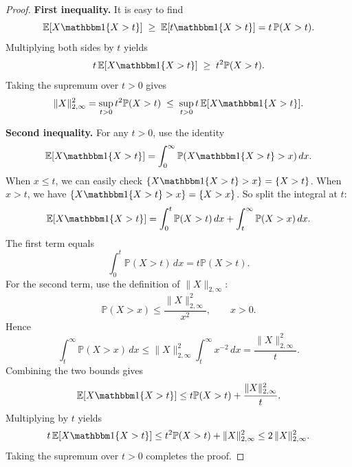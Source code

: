 \documentclass[12pt]{article}
\renewcommand{\(}{\left(}%
\renewcommand{\)}{\right)}%
\renewcommand{\[}{\left[}%
\renewcommand{\]}{\right]}%
\newcommand{\p}{\mathbb{P}}
\newtheorem{proof}{Proof.}}
\begin{document}
\begin{proof}

\textbf{First inequality.}
It is easy to find
\begin{equation*}
\mathbb E [X \mathbbm 1\{X>t\} ]
\;\ge\; \mathbb E [t \mathbbm 1\{X>t\}]=
t\,\p(X>t).
\end{equation*}
Multiplying both sides by $t$ yields
\begin{equation*}
t\,\mathbb E [X \mathbbm 1\{X>t\} ]
\;\ge\;
t^2 \p(X>t).
\end{equation*}
Taking the supremum over $t>0$ gives
\begin{equation*}
\|X\|_{2,\infty}^2
=
\sup_{t>0} t^2 \p(X>t)
\;\le\;
\sup_{t>0} t\,\mathbb E [X \mathbbm 1\{X>t\} ].
\end{equation*}

\medskip
\noindent
\textbf{Second inequality.}
For any $t>0$, use the identity
\begin{equation*}
\mathbb E [X \mathbbm 1\{X>t\} ]
=
\int_0^\infty \p (X \mathbbm 1\{X>t\}>x )\,dx.
\end{equation*}
When $x\leq t$, we can easily check $\{X \mathbbm 1\{X>t\}>x\}=\{X>t\}$. When $x>t$, we have $\{X \mathbbm 1\{X>t\}>x\}=\{X>x\}$. So
split the integral at $t$:
\begin{equation*}
\mathbb E [X \mathbbm 1\{X>t\} ]
=
\int_0^t \p(X>t)\,dx
+
\int_t^\infty \p(X>x)\,dx.
\end{equation*}
The first term equals
\begin{equation*}
\int_0^t \p(X>t)\,dx
=
t \p(X>t).
\end{equation*}
For the second term, use the definition of $\|X\|_{2,\infty}$:
\begin{equation*}
\p(X>x)
\le
\frac{\|X\|_{2,\infty}^2}{x^2},
\qquad x>0.
\end{equation*}
Hence
\begin{equation*}
\int_t^\infty \p(X>x)\,dx
\le
\|X\|_{2,\infty}^2
\int_t^\infty x^{-2}\,dx
=
\frac{\|X\|_{2,\infty}^2}{t}.
\end{equation*}
Combining the two bounds gives
\begin{equation*}
\mathbb E [X \mathbbm 1\{X>t\} ]
\le
t \p(X>t)
+
\frac{\|X\|_{2,\infty}^2}{t}.
\end{equation*}
Multiplying by $t$ yields
\begin{equation*}
t\,\mathbb E [X \mathbbm 1\{X>t\} ]
\le
t^2 \p(X>t)
+
\|X\|_{2,\infty}^2
\le
2\,\|X\|_{2,\infty}^2.
\end{equation*}
Taking the supremum over $t>0$ completes the proof.
\end{proof}
\end{document}

